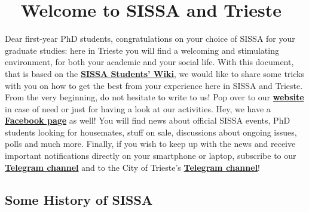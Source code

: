 \documentclass{sissavademecum}
\begin{document}
\maketitle
\tableofcontents
\newpage

\setlength{\parskip}{1em}



\chapter{\texorpdfstring{\faGlassCheers\ }{} Welcome to SISSA and Trieste}

Dear first-year PhD students, congratulations on your choice of SISSA for your graduate studies: here in Trieste you will find a welcoming and stimulating environment, for both your academic and your social life. With this document, that is based on the \href{https://wiki.sissa.it/students/index.php/Main_Page}{\textbf{SISSA Students' Wiki}}, we would like to share some tricks with you on how to get the best from your experience here in SISSA and Trieste. \\
From the very beginning, do not hesitate to write to us! Pop over to our \href{http://students.sissa.it/studentscouncil/index.html}{\textbf{website}} in case of need or just for having a look at our activities. Hey, we have a \href{https://www.facebook.com/groups/sissastudents/}{\textbf{Facebook page}} as well! You will find news about official SISSA events, PhD students looking for housemates, stuff on sale, discussions about ongoing issues, polls and much more. Finally, if you wish to keep up with the news and receive important notifications directly on your smartphone or laptop, subscribe to our \href{https://t.me/joinchat/FVSmmUDh3_QyYzU0}{\textbf{Telegram channel}} and to the City of Trieste's \href{https://telegram.me/comunetrieste}{\textbf{Telegram channel}}!


\section{Some History of SISSA}
\end{document}
